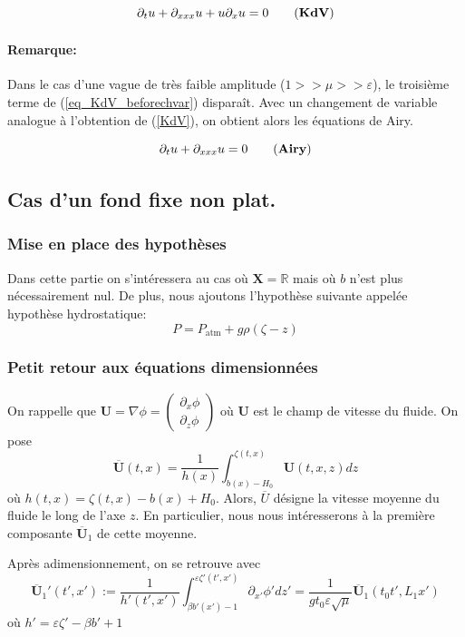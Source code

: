 \documentclass[12pt,a4paper]{article}
\numberwithin{equation}{section}
\begin{document}
\begin{equation}
    \partial_tu + \partial_{xxx}u +u\partial_xu  = 0 \label{KdV}\tag{\textbf{KdV}}
\end{equation}
\paragraph{Remarque:} Dans le cas d'une vague de très faible amplitude ($1>>\mu>>\varepsilon$), le troisième terme de (\ref{eq_KdV_beforechvar}) disparaît.  Avec un changement de variable analogue à l'obtention de (\ref{KdV}), on obtient alors les équations de Airy.

\begin{equation}
    \partial_tu + \partial_{xxx}u = 0 \label{Airy}\tag{\textbf{Airy}}
\end{equation}

\subsection{Cas d'un fond fixe non plat.} 
\subsubsection{Mise en place des hypothèses}
Dans cette partie on s'intéressera au cas où $\textbf{X} = \mathbb{R}$ mais où $b$ n'est plus nécessairement nul. De plus, nous ajoutons l'hypothèse suivante appelée hypothèse hydrostatique:
\begin{equation}
    P = P_\text{atm} + g\rho(\zeta - z)
\end{equation}
\subsubsection{Petit retour aux équations dimensionnées}
On rappelle que $\textbf{U} = \nabla \phi = \left(\begin{array}{cc}
     \partial_x\phi\\
     \partial_z\phi
\end{array}\right)$ où $\textbf{U}$ est le champ de vitesse du fluide. On pose $$\overline{\textbf{U}}(t,x) = \frac{1}{h(x)}\int_{b(x)-H_0}^{\zeta(t,x)} \textbf{U}(t,x,z)dz$$
où $h(t,x) = \zeta(t,x) - b(x) + H_0$. Alors, $\overline{U}$ désigne la vitesse moyenne du fluide le long de l'axe $z$. En particulier, nous nous intéresserons à la première composante $\overline{\textbf{U}}_1$ de cette moyenne.

Après adimensionnement, on se retrouve avec 
$$\overline{\textbf{U}}_1'(t',x') :=\frac{1}{h'(t',x')}\int_{\beta b'(x')-1}^{\varepsilon\zeta'(t',x')}\partial_{x'}\phi'dz'= \frac{1}{gt_0\varepsilon\sqrt{\mu}}\overline{\textbf{U}}_1(t_0t',L_1x')  $$
où $ h' =  \varepsilon\zeta' - \beta b' + 1$
\end{document}
